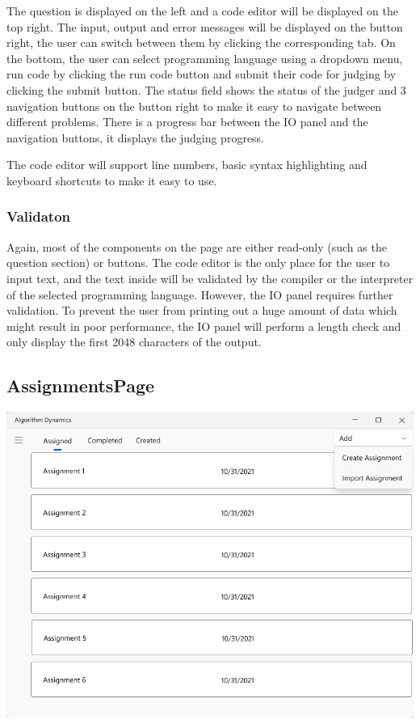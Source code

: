 \documentclass[a4paper]{report}
\begin{document}
The question is displayed on the left and a code editor will be displayed on the top right. The input, output and error messages will be displayed on the button right, the user can switch between them by clicking the corresponding tab. On the bottom, the user can select programming language using a dropdown menu, run code by clicking the run code button and submit their code for judging by clicking the submit button. The status field shows the status of the judger and 3 navigation buttons on the button right to make it easy to navigate between different problems. There is a progress bar between the IO panel and the navigation buttons, it displays the judging progress.

The code editor will support line numbers, basic syntax highlighting and keyboard shortcuts to make it easy to use.

\subsubsection{Validaton}

Again, most of the components on the page are either read-only (such as the question section) or buttons. The code editor is the only place for the user to input text, and the text inside will be validated by the compiler or the interpreter of the selected programming language. However, the IO panel requires further validation. To prevent the user from printing out a huge amount of data which might result in poor performance, the IO panel will perform a length check and only display the first 2048 characters of the output.

\subsection{AssignmentsPage}
\label{sec:AssignmentsPageDesign}

\includegraphics[width=\textwidth, height=\textheight, keepaspectratio]{AssignmentsPage-design}
\end{document}
